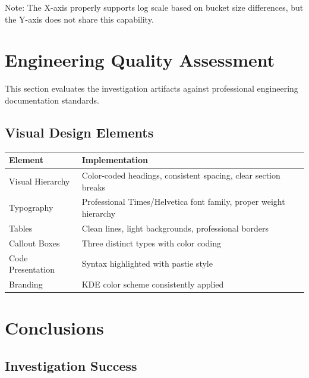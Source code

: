 \documentclass[
    11pt,
    a4paper,
    oneside,
    abstract=on,
    parskip=full+,
    headings=big,
    bibliography=totoc
]{scrartcl}
\begin{document}
\begin{important}
    Note: The X-axis properly supports log scale based on bucket size differences, but the Y-axis does not share this capability.
\end{important}

\newpage
\section{Engineering Quality Assessment}

This section evaluates the investigation artifacts against professional engineering documentation standards.

\subsection{Visual Design Elements}

\begin{tabular}{p{4cm}p{10cm}}
    \toprule
    \textbf{Element} & \textbf{Implementation} \\
    \midrule
    Visual Hierarchy & Color-coded headings, consistent spacing, clear section breaks \\
    Typography & Professional Times/Helvetica font family, proper weight hierarchy \\
    Tables & Clean lines, light backgrounds, professional borders \\
    Callout Boxes & Three distinct types with color coding \\
    Code Presentation & Syntax highlighted with pastie style \\
    Branding & KDE color scheme consistently applied \\
    \bottomrule
\end{tabular}

\section{Conclusions}

\subsection{Investigation Success}
\end{document}
